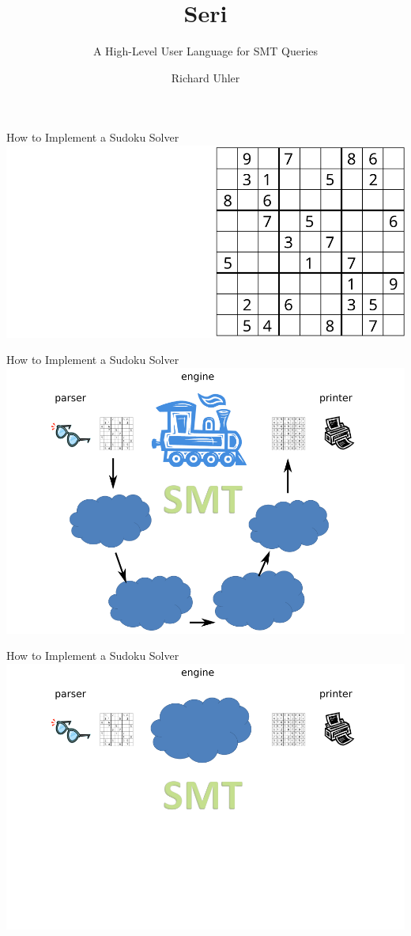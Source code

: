 \documentclass{beamer}
\title{Seri}
\subtitle{A High-Level User Language for SMT Queries}
\author{Richard Uhler}
\begin{document}
\begin{frame}
    \titlepage
\end{frame}

\begin{frame}{How to Implement a Sudoku Solver}
\includegraphics[width=\textwidth]{input2}
\end{frame}

\begin{frame}{How to Implement a Sudoku Solver}
\includegraphics[width=\textwidth]{current8}
\end{frame}

\begin{frame}{How to Implement a Sudoku Solver}
\includegraphics[width=\textwidth]{current11}
\end{frame}
 
\end{document}
